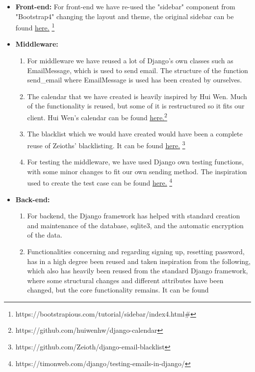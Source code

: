 \documentclass{article}
\begin{document}
\begin{itemize}

    
    \item \textbf{Front-end:} For front-end we have re-used the "sidebar" component from "Bootstrap4" changing the layout and theme, the original sidebar can be found \href{https://bootstrapious.com/tutorial/sidebar/index4.html#}{\underline{here.}} \footnote{https://bootstrapious.com/tutorial/sidebar/index4.html#}
    \item \textbf{Middleware: } 
    \begin{enumerate}
        \item For middleware we have reused a lot of Django's own classes such as EmailMessage, which is used to send email. The structure of the function send\_email where EmailMessage is used has been created by ourselves.
        \item The calendar that we have created is heavily inspired by Hui Wen. Much of the functionality is reused, but some of it is restructured so it fits our client. Hui Wen's calendar can be found \href{https://github.com/huiwenhw/django-calendar}{\underline{here.}}\footnote{https://github.com/huiwenhw/django-calendar} 
        \item The blacklist which we would have created would have been a complete reuse of Zeioths' blacklisting. It can be found \href{https://github.com/Zeioth/django-email-blacklist}{\underline{here.}} \footnote{https://github.com/Zeioth/django-email-blacklist}
        \item For testing the middleware, we have used Django own testing functions, with some minor changes to fit our own sending method. The inspiration used to create the test case can be found \href{https://timonweb.com/django/testing-emails-in-django/}{\underline{here.}} \footnote{https://timonweb.com/django/testing-emails-in-django/}
        \end{enumerate}
    \item \textbf{Back-end: } 
    \begin{enumerate}
        \item For backend, the Django framework has helped with standard creation and maintenance of the database, sqlite3, and the automatic encryption of the data. 
        \item Functionalities concerning and regarding signing up, resetting password, has in a high degree been reused and taken inspiration from the following, which also has heavily been reused from the standard Django framework, where some structural changes and different attributes have been changed, but the core functionality remains. It can be found

\end{enumerate}
\end{itemize}
\end{document}
